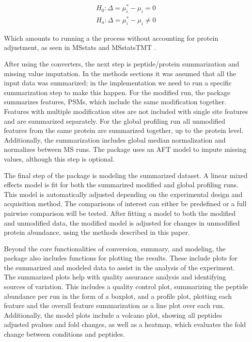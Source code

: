 \documentclass[mcp]{article}
\numberwithin{table}{section}
\begin{document}
\begin{equation}
\begin{aligned}
H_{0}: \Delta = \mu_{i}^{\ast} - \mu_{i} = 0 \\
H_{a}: \Delta = \mu_{i}^{\ast} - \mu_{i} \neq 0
\end{aligned}
\label{eq_9}
\end{equation}

Which amounts to running a the process without accounting for protein adjustment, as seen in MSstats and MSstatsTMT \cite{Choi:2014} \cite{Huang:2020}.

After using the converters, the next step is peptide/protein summarization and missing value imputation. In the methods sections it was assumed that all the input data was summarized; in the implementation we need to run a specific summarization step to make this happen. For the modified run, the package summarizes features, PSMs, which include the same modification together. Features with multiple modification sites are not included with single site features and are summarized separately. For the global profiling run all unmodified features from the same protein are summarized together, up to the protein level. Additionally, the summarization includes global median normalization and normalizes between MS runs. The package uses an AFT model to impute missing values, although this step is optional.

The final step of the package is modeling the summarized dataset. A linear mixed effects model is fit for both the summarized modified and global profiling runs. This model is automatically adjusted depending on the experimental design and acquisition method. The comparisons of interest can either be predefined or a full pairwise comparison will be tested. After fitting a model to both the modified and unmodified data, the modified model is adjusted for changes in unmodified protein abundance, using the methods described in this paper. 

Beyond the core functionalities of conversion, summary, and modeling, the package also includes functions for plotting the results. These include plots for the summarized and modeled data to assist in the analysis of the experiment. The summarized plots help with quality assurance analysis and identifying sources of variation. This includes a quality control plot, summarizing the peptide abundance per run in the form of a boxplot, and a profile plot, plotting each feature and the overall feature summarization as a line plot over each run. Additionally, the model plots include a volcano plot, showing all peptides adjusted pvalues and fold changes, as well as a heatmap, which evaluates the fold change between conditions and peptides. 
\end{document}
